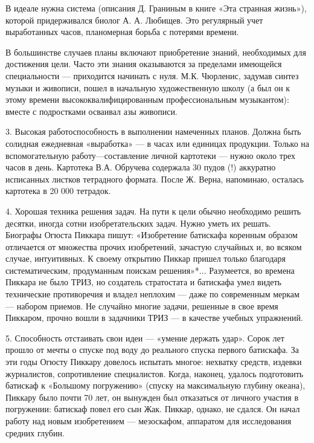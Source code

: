 В идеале  нужна система  (описания Д. Граниным  в книге  «Эта странная
жизнь»), которой  придерживался биолог  А. А. Любищев.  Это регулярный
учет выработанных часов, планомерная борьба с потерями времени.


В большинстве случаев планы  включают приобретение знаний, необходимых
для  достижения  цели.  Часто  эти  знания  оказываются  за  пределами
имеющейся   специальности  —   приходится   начинать   с  нуля.   М.К.
Чюрленис,  задумав  синтез  музыки   и  живописи,  пошел  в  начальную
художественную школу (а был он к этому времени высококвалифицированным
профессиональным  музыкантом):  вместе   с  подростками  осваивал  азы
живописи.

3. Высокая  работоспособность в  выполнении намеченных  планов. Должна
быть солидная ежедневная «выработка» — в часах или единицах продукции.
Только на вспомогательную работу—составление  личной картотеки — нужно
около трех  часов в день.  Картотека В.А. Обручева содержала  30 пудов
(!) аккуратно  исписанных листков тетрадного формата.  После Ж. Верна,
напоминаю, осталась картотека в 20 000 тетрадок.

4. Хорошая  техника решения  задач. На пути  к цели  обычно необходимо
решить десятки,  иногда сотни  изобретательских задач. Нужно  уметь их
решать. Биографы Огюста Пиккара пишут: «Изобретение батискафа коренным
образом отличается от множества прочих изобретений, зачастую случайных
и,  во всяком  случае, интуитивных.  К своему  открытию Пиккар  пришел
только  благодаря  систематическим, продуманным  поискам  решения»*...
Разумеется, во времена Пиккара не  было ТРИЗ, но создатель стратостата
и батискафа умел  видеть технические противоречия и  владел неплохим —
даже  по современным  меркам  — набором  приемов.  Не случайно  многие
задачи, решенные в свое время  Пиккаром, прочно вошли в задачники ТРИЗ
— в качестве учебных упражнений.

5. Способность отстаивать свои идеи — «умение держать удар». Сорок лет
прошло  от  мечты  о  спуске  под воду  до  реального  спуска  первого
батискафа.  За  эти  годы  Огюсту Пиккару  довелось  испытать  многое:
нехватку  средств,  издевки журналистов,  сопротивление  специалистов.
Когда, наконец,  удалось подготовить батискаф к  «Большому погружению»
(спуску на максимальную глубину океана), Пиккару было почти 70 лет, он
вынужден  был отказаться  от  личного участия  в погружении:  батискаф
повел его  сын Жак.  Пиккар, однако,  не сдался.  Он начал  работу над
новым изобретением  — мезоскафом,  аппаратом для  исследования средних
глубин.

